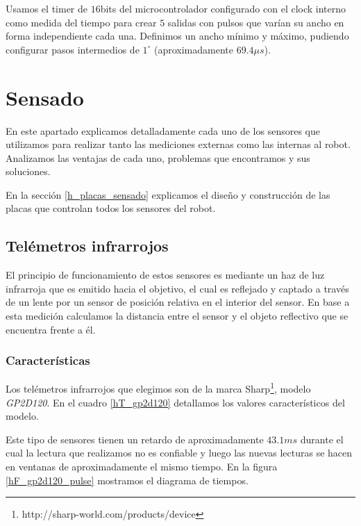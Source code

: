 Usamos el timer de $16$bits del microcontrolador configurado con el clock interno como medida del tiempo para crear $5$ salidas con
pulsos que var\'ian su ancho en forma independiente cada una.
Definimos un ancho m\'inimo y m\'aximo, pudiendo configurar pasos intermedios de $1^{\circ}$ (aproximadamente $69.4\mu s$).

\section{Sensado}
\label{h_sensado}

En este apartado explicamos detalladamente cada uno de los sensores que utilizamos para realizar tanto las mediciones externas como las internas al robot.
Analizamos las ventajas de cada uno, problemas que encontramos y sus soluciones.

En la secci\'on \ref{h_placas_sensado} explicamos el dise\~no y construcci\'on de las placas que controlan todos los sensores del robot.

\subsection{Tel\'emetros infrarrojos}
\label{h_sensado_telemetros}

El principio de funcionamiento de estos sensores es mediante un haz de luz infrarroja que es emitido hacia el objetivo, el cual
es reflejado y captado a trav\'es de un lente por un sensor de posici\'on relativa en el interior del sensor.
En base a esta medici\'on calculamos la distancia entre el sensor y el objeto reflectivo que se encuentra frente a \'el.

\subsubsection{Caracter\'isticas}
\label{h_sensado_telemetros_caracteristicas}

Los tel\'emetros infrarrojos que elegimos son de la marca Sharp\footnote{http://sharp-world.com/products/device}, modelo \emph{GP2D120}.
En el cuadro \ref{hT_gp2d120} detallamos los valores caracter\'isticos del modelo.

Este tipo de sensores tienen un retardo de aproximadamente $43.1ms$ durante el cual la lectura que realizamos no es confiable y luego
las nuevas lecturas se hacen en ventanas de aproximadamente el mismo tiempo.
En la figura \ref{hF_gp2d120_pulse} mostramos el diagrama de tiempos.


